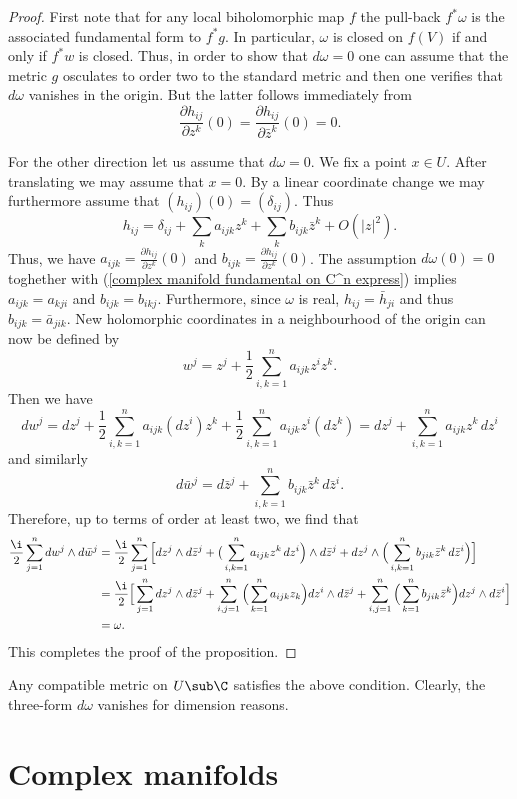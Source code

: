 \begin{proof}
First note that for any local biholomorphic map $f$ the pull-back $f^*\omega$ is the associated fundamental form to $f^*g$. In particular, $\omega$ is closed on $f(V)$ if and only if $f^*w$ is closed. Thus, in order to show that $d\omega=0$ one can assume that the metric $g$ osculates to order two to the standard metric and then one verifies that $d\omega$ vanishes in the origin. But the latter follows immediately from
\[\frac{\partial h_{ij}}{\partial z^k}(0)=\frac{\partial h_{ij}}{\partial\bar{z}^k}(0)=0.\]

For the other direction let us assume that $d\omega=0$. We fix a point $x\in U$. After translating we may assume that $x=0$. By a linear coordinate change we may furthermore assume that $(h_{ij})(0)=(\delta_{ij})$. Thus
\[h_{ij}=\delta_{ij}+\sum_ka_{ijk}z^k+\sum_kb_{ijk}\bar{z}^k+O(|z|^2).\]
Thus, we have $a_{ijk}=\frac{\partial h_{ij}}{\partial z^k}(0)$ and $b_{ijk}=\frac{\partial h_{ij}}{\partial z^k}(0)$. The assumption $d\omega(0)=0$ toghether with (\ref{complex manifold fundamental on C^n express}) implies $a_{ijk}=a_{kji}$ and $b_{ijk}=b_{ikj}$. Furthermore, since $\omega$ is real, $h_{ij}=\bar{h}_{ji}$ and thus $b_{ijk}=\bar{a}_{jik}$. New holomorphic coordinates in a neighbourhood of the origin can now be defined by
\[w^j=z^j+\frac{1}{2}\sum_{i,k=1}^{n}a_{ijk}z^iz^k.\]
Then we have
\[dw^j=dz^j+\frac{1}{2}\sum_{i,k=1}^{n}a_{ijk}(dz^i)z^k+\frac{1}{2}\sum_{i,k=1}^{n}a_{ijk}z^i(dz^k)=dz^j+\sum_{i,k=1}^{n}a_{ijk}z^k\,dz^i\]
and similarly
\[d\bar{w}^j=d\bar{z}^j+\sum_{i,k=1}^{n}b_{ijk}\bar{z}^k\,d\bar{z}^i.\]
Therefore, up to terms of order at least two, we find that
\begin{align*}
\frac{\i}{2}\sum_{j=1}^{n}dw^j\wedge d\bar{w}^j&=\frac{\i}{2}\sum_{j=1}^{n}\Big[dz^j\wedge d\bar{z}^j+\big(\sum_{i,k=1}^{n}a_{ijk}z^k\,dz^i\Big)\wedge d\bar{z}^j+dz^j\wedge\Big(\sum_{i,k=1}^{n}b_{jik}\bar{z}^k\,d\bar{z}^i\Big)\Big]\\
&=\frac{\i}{2}\Big[\sum_{j=1}^{n}dz^j\wedge d\bar{z}^j+\sum_{i,j=1}^{n}\Big(\sum_{k=1}^{n}a_{ijk}z_k\Big)dz^i\wedge d\bar{z}^j+\sum_{i,j=1}^{n}\Big(\sum_{k=1}^{n}b_{jik}\bar{z}^k\Big)dz^j\wedge d\bar{z}^i\Big]\\
&=\omega.
\end{align*}
This completes the proof of the proposition.
\end{proof}
\begin{example}
Any compatible metric on $U\sub\C$ satisfies the above condition. Clearly, the three-form $d\omega$ vanishes for dimension reasons.
\end{example}
\section{Complex manifolds}